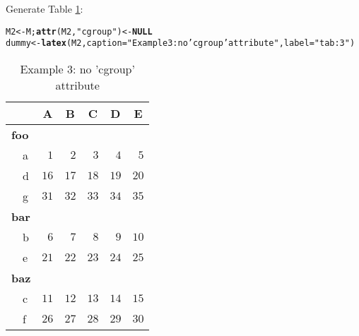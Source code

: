 \documentclass{article}\usepackage[]{graphicx}\usepackage[]{color}
\makeatletter
\newcommand{\hlstr}[1]{\textcolor[rgb]{0.192,0.494,0.8}{#1}}%
\newcommand{\hlstd}[1]{\textcolor[rgb]{0.345,0.345,0.345}{#1}}%
\newcommand{\hlkwa}[1]{\textcolor[rgb]{0.161,0.373,0.58}{\textbf{#1}}}%
\newcommand{\hlkwb}[1]{\textcolor[rgb]{0.69,0.353,0.396}{#1}}%
\newcommand{\hlkwc}[1]{\textcolor[rgb]{0.333,0.667,0.333}{#1}}%
\newcommand{\hlkwd}[1]{\textcolor[rgb]{0.737,0.353,0.396}{\textbf{#1}}}%
\newenvironment{kframe}{%
 \def\at@end@of@kframe{}%
 \ifinner\ifhmode%
  \def\at@end@of@kframe{\end{minipage}}%
  \begin{minipage}{\columnwidth}%
 \fi\fi%
 \def\FrameCommand##1{\hskip\@totalleftmargin \hskip-\fboxsep
 \colorbox{shadecolor}{##1}\hskip-\fboxsep
     \hskip-\linewidth \hskip-\@totalleftmargin \hskip\columnwidth}%
 \MakeFramed {\advance\hsize-\width
   \@totalleftmargin\z@ \linewidth\hsize
   \@setminipage}}%
 {\par\unskip\endMakeFramed%
 \at@end@of@kframe}
\makeatother
\begin{document}
Generate Table  \ref{tab:3}:
\begin{kframe}
\begin{alltt}
\hlstd{M2} \hlkwb{<-} \hlstd{M;} \hlkwd{attr}\hlstd{(M2,} \hlstr{"cgroup"}\hlstd{)} \hlkwb{<-} \hlkwa{NULL}
\hlstd{dummy} \hlkwb{<-} \hlkwd{latex}\hlstd{(M2,} \hlkwc{caption}\hlstd{=}\hlstr{"Example 3: no 'cgroup' attribute"}\hlstd{,} \hlkwc{label}\hlstd{=}\hlstr{"tab:3"}\hlstd{)}
\end{alltt}
\end{kframe}%
\begin{table}[!tbp]
\caption{Example 3: no 'cgroup' attribute\label{tab:3}} 
\begin{center}
\begin{tabular}{lrrrrr}
\hline\hline
\multicolumn{1}{l}{}&\multicolumn{1}{c}{A}&\multicolumn{1}{c}{B}&\multicolumn{1}{c}{C}&\multicolumn{1}{c}{D}&\multicolumn{1}{c}{E}\tabularnewline
\hline
{\bfseries foo}&&&&&\tabularnewline
~~a&$ 1$&$ 2$&$ 3$&$ 4$&$ 5$\tabularnewline
~~d&$16$&$17$&$18$&$19$&$20$\tabularnewline
~~g&$31$&$32$&$33$&$34$&$35$\tabularnewline
\hline
{\bfseries bar}&&&&&\tabularnewline
~~b&$ 6$&$ 7$&$ 8$&$ 9$&$10$\tabularnewline
~~e&$21$&$22$&$23$&$24$&$25$\tabularnewline
\hline
{\bfseries baz}&&&&&\tabularnewline
~~c&$11$&$12$&$13$&$14$&$15$\tabularnewline
~~f&$26$&$27$&$28$&$29$&$30$\tabularnewline
\hline
\end{tabular}\end{center}

\end{table}
\end{document}
